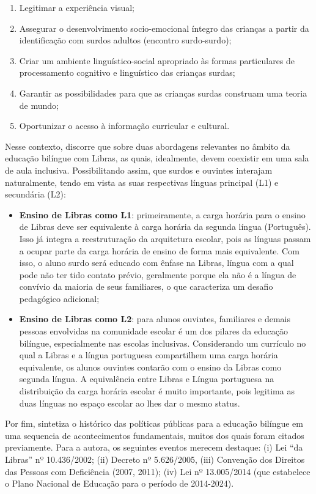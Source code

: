 \begin{enumerate}[label=(\alph*),noitemsep,topsep=0pt]
    \item Legitimar a experiência visual;
    \item Assegurar o desenvolvimento socio-emocional íntegro das crianças a partir da identificação com surdos adultos (encontro surdo-surdo);
    \item Criar um ambiente linguístico-social apropriado às formas particulares de processamento cognitivo e linguístico das crianças surdas;
    \item Garantir as possibilidades para que as crianças surdas construam uma teoria de mundo;
    \item Oportunizar o acesso à informação curricular e cultural.
\end{enumerate}

Nesse contexto,  discorre que sobre duas abordagens relevantes no âmbito da educação bilíngue com Libras, as quais, idealmente, devem coexistir em uma sala de aula inclusiva. Possibilitando assim, que surdos e ouvintes interajam naturalmente, tendo em vista as suas respectivas línguas principal (L1) e secundária (L2):
\begin{itemize}
    \item \textbf{Ensino de Libras como L1}: primeiramente, a carga horária para o ensino de Libras deve ser equivalente à carga horária da segunda língua (Português). Isso já integra a reestruturação da arquitetura escolar, pois as línguas passam a ocupar parte da carga horária de ensino de forma mais equivalente. Com isso, o aluno surdo será educado com ênfase na Libras, língua com a qual pode não ter tido contato prévio, geralmente porque ela não é a língua de convívio da maioria de seus familiares, o que caracteriza um desafio pedagógico adicional;
    \item \textbf{Ensino de Libras como L2}: para alunos ouvintes, familiares e demais pessoas envolvidas na comunidade escolar é um dos pilares da educação bilíngue, especialmente nas escolas inclusivas. Considerando um currículo no qual a Libras e a língua portuguesa compartilhem uma carga horária equivalente, os alunos ouvintes contarão com o ensino da Libras como segunda língua. A equivalência entre Libras e Língua portuguesa na distribuição da carga horária escolar é muito importante, pois legitima as duas línguas no espaço escolar ao lhes dar o mesmo status.
\end{itemize}

Por fim,  sintetiza o histórico das políticas públicas para a educação bilíngue em uma sequencia de acontecimentos fundamentais, muitos dos quais foram citados previamente. Para a autora, os seguintes eventos merecem destaque: (i) Lei ``da Libras'' nº 10.436/2002; (ii) Decreto nº 5.626/2005, (iii) Convenção dos Direitos das Pessoas com Deficiência (2007, 2011); (iv) Lei nº 13.005/2014 (que estabelece o Plano Nacional de Educação para o período de 2014-2024).


